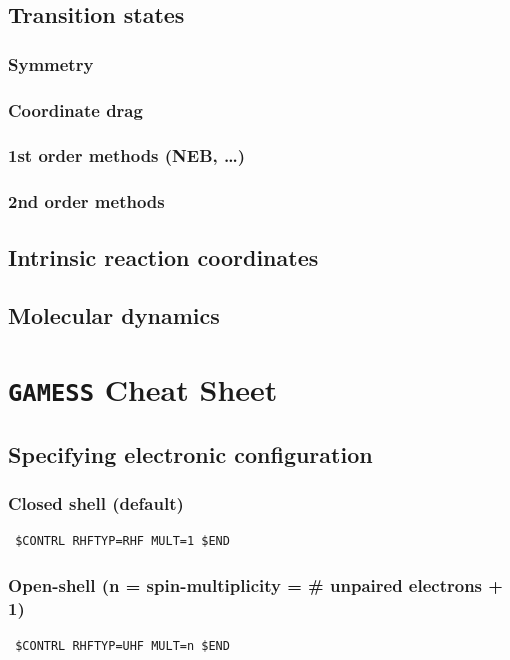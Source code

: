 \documentclass[11pt]{article}
\begin{document}
\subsection{Transition states}
\label{sec:org8dab678}
\subsubsection{Symmetry}
\label{sec:org2310471}
\subsubsection{Coordinate drag}
\label{sec:orgdb5fcbf}
\subsubsection{1st order methods (NEB, \ldots{})}
\label{sec:org24fe741}
\subsubsection{2nd order methods}
\label{sec:org22d2f24}
\subsection{Intrinsic reaction coordinates}
\label{sec:org710f7be}
\subsection{Molecular dynamics}
\label{sec:orgf80c549}
\newpage

\section{\texttt{GAMESS} Cheat Sheet}
\label{sec:org350a8d3}
\subsection{Specifying electronic configuration}
\label{sec:orgb0703e5}
\subsubsection{Closed shell (default)}
\label{sec:org87ebcbc}
\begin{verbatim}
 $CONTRL RHFTYP=RHF MULT=1 $END
\end{verbatim}

\subsubsection{Open-shell (n = spin-multiplicity = \# unpaired electrons + 1)}
\label{sec:orgff07ecf}
\begin{verbatim}
 $CONTRL RHFTYP=UHF MULT=n $END
\end{verbatim}
\end{document}
